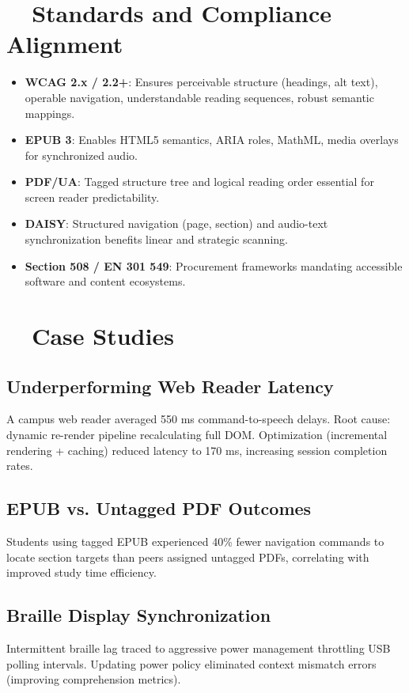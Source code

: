 \section{~~Standards and Compliance Alignment}
\label{sec:sr27-standards}
\begin{itemize}
	\item \textbf{WCAG 2.x / 2.2+}: Ensures perceivable structure (headings, alt text), operable navigation, understandable reading sequences, robust semantic mappings.
	\item \textbf{EPUB 3}: Enables HTML5 semantics, ARIA roles, MathML, media overlays for synchronized audio.
	\item \textbf{PDF/UA}: Tagged structure tree and logical reading order essential for screen reader predictability.
	\item \textbf{DAISY}: Structured navigation (page, section) and audio-text synchronization benefits linear and strategic scanning.
	\item \textbf{Section 508 / EN 301 549}: Procurement frameworks mandating accessible software and content ecosystems.
\end{itemize}

\section{~~Case Studies}
\label{sec:sr27-case-studies}
\subsection*{Underperforming Web Reader Latency}
A campus web reader averaged 550 ms command-to-speech delays. Root cause: dynamic re-render pipeline recalculating full DOM. Optimization (incremental rendering + caching) reduced latency to 170 ms, increasing session completion rates\supercite{Fowler2011ScreenReaderLatency}.

\subsection*{EPUB vs. Untagged PDF Outcomes}
Students using tagged EPUB experienced 40\% fewer navigation commands to locate section targets than peers assigned untagged PDFs, correlating with improved study time efficiency\supercite{Jones2021, Smith2022}.

\subsection*{Braille Display Synchronization}
Intermittent braille lag traced to aggressive power management throttling USB polling intervals. Updating power policy eliminated context mismatch errors (improving comprehension metrics).

